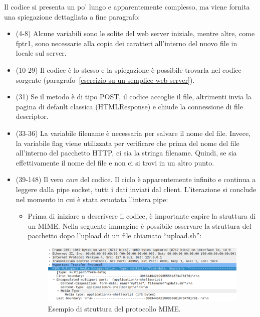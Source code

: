 \documentclass[a4paper]{article}
\newcommand{\dquotes}[1]{``#1''}
\begin{document}
	\noindent
	Il codice si presenta un po' lungo e apparentemente complesso, ma viene fornita una spiegazione dettagliata a fine paragrafo:
	
	\begin{itemize}
		\item (4-8) Alcune variabili sono le solite del web server iniziale, mentre altre, come \textsf{fptr1}, sono necessarie alla copia dei caratteri all'interno del nuovo file in locale sul server.
		
		\item (10-29) Il codice è lo stesso e la spiegazione è possibile trovarla nel codice sorgente (paragrafo~\ref{esercizio su un semplice web server}).
		
		\item (31) Se il metodo è di tipo \textsf{POST}, il codice accoglie il file, altrimenti invia la pagina di default classica (\textsf{HTMLResponse}) e chiude la connessione di file descriptor.
		
		\item (33-36) La variabile filename è necessaria per salvare il nome del file. Invece, la variabile \textsf{flag} viene utilizzata per verificare che prima del nome del file all'interno del pacchetto HTTP, ci sia la stringa \textsf{filename}. Quindi, se sia effettivamente il nome del file e non ci si trovi in un altro punto.
		
		\item (39-148) Il vero \emph{core} del codice. Il ciclo è apparentemente infinito e continua a leggere dalla pipe socket, tutti i dati inviati dal client. L'iterazione si conclude nel momento in cui è stata svuotata l'intera pipe:
		\begin{itemize}
			\item Prima di iniziare a descrivere il codice, è importante capire la struttura di un MIME. Nella seguente immagine è possibile osservare la struttura del pacchetto dopo l'upload di un file chiamato \dquotes{\textsf{upload.sh}}:
			\begin{figure}[!htp]
				\centering
				\includegraphics[width=\textwidth]{img/web-server/web-server-4.png}
				\caption{Esempio di struttura del protocollo MIME.}
				\label{esempio di struttura del protocollo MIME}
			\end{figure}
			

\end{itemize}
\end{itemize}
\end{document}

